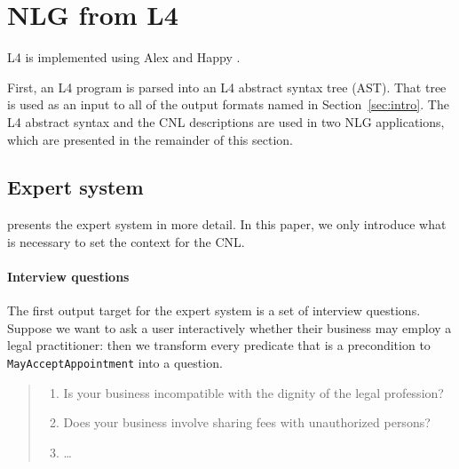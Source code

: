 \documentclass[11pt]{article}
\begin{document}


\section{NLG from L4}
\label{sec:nlg}


L4 is implemented using Alex \cite{dornan2003alex} and Happy \cite{marlow1997happy}. 

First, an L4 program is parsed into an L4 abstract syntax tree (AST). That tree is used as an input to all of the output formats named in Section~\ref{sec:intro}. 
The L4 abstract syntax and the CNL descriptions are used in two NLG applications, which are presented in the remainder of this section.

\subsection{Expert system}
\label{sec:expert_system}


\citet{listenmaa2021inlg} presents the expert system in more detail. In this paper, we only introduce what is necessary to set the context for the CNL.


\paragraph{Interview questions}
\label{sec:DAinterview}

The first output target for the expert system is a set of interview questions. Suppose we want to ask a user interactively whether their business may employ a legal practitioner: then we transform every predicate that is a precondition to {\small \texttt{MayAcceptAppointment}} into a question.

\begin{quote}
\begin{enumerate}
\item Is your business incompatible with the dignity of the legal profession?
\item Does your business involve sharing fees with unauthorized persons?
\item \dots
\end{enumerate}
\end{quote}
\end{document}

